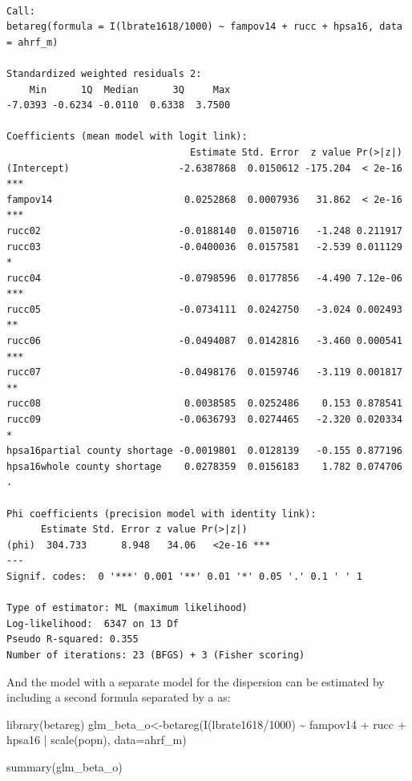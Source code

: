 \documentclass[
  letterpaper,
  DIV=11,
  numbers=noendperiod]{scrreprt}
\newenvironment{Shaded}{\begin{snugshade}}{\end{snugshade}}
\newcommand{\AttributeTok}[1]{\textcolor[rgb]{0.40,0.45,0.13}{#1}}
\newcommand{\DecValTok}[1]{\textcolor[rgb]{0.68,0.00,0.00}{#1}}
\newcommand{\FunctionTok}[1]{\textcolor[rgb]{0.28,0.35,0.67}{#1}}
\newcommand{\NormalTok}[1]{\textcolor[rgb]{0.00,0.23,0.31}{#1}}
\newcommand{\OtherTok}[1]{\textcolor[rgb]{0.00,0.23,0.31}{#1}}
\newcommand{\SpecialCharTok}[1]{\textcolor[rgb]{0.37,0.37,0.37}{#1}}
\begin{document}
\begin{verbatim}

Call:
betareg(formula = I(lbrate1618/1000) ~ fampov14 + rucc + hpsa16, data = ahrf_m)

Standardized weighted residuals 2:
    Min      1Q  Median      3Q     Max 
-7.0393 -0.6234 -0.0110  0.6338  3.7500 

Coefficients (mean model with logit link):
                                Estimate Std. Error  z value Pr(>|z|)    
(Intercept)                   -2.6387868  0.0150612 -175.204  < 2e-16 ***
fampov14                       0.0252868  0.0007936   31.862  < 2e-16 ***
rucc02                        -0.0188140  0.0150716   -1.248 0.211917    
rucc03                        -0.0400036  0.0157581   -2.539 0.011129 *  
rucc04                        -0.0798596  0.0177856   -4.490 7.12e-06 ***
rucc05                        -0.0734111  0.0242750   -3.024 0.002493 ** 
rucc06                        -0.0494087  0.0142816   -3.460 0.000541 ***
rucc07                        -0.0498176  0.0159746   -3.119 0.001817 ** 
rucc08                         0.0038585  0.0252486    0.153 0.878541    
rucc09                        -0.0636793  0.0274465   -2.320 0.020334 *  
hpsa16partial county shortage -0.0019801  0.0128139   -0.155 0.877196    
hpsa16whole county shortage    0.0278359  0.0156183    1.782 0.074706 .  

Phi coefficients (precision model with identity link):
      Estimate Std. Error z value Pr(>|z|)    
(phi)  304.733      8.948   34.06   <2e-16 ***
---
Signif. codes:  0 '***' 0.001 '**' 0.01 '*' 0.05 '.' 0.1 ' ' 1 

Type of estimator: ML (maximum likelihood)
Log-likelihood:  6347 on 13 Df
Pseudo R-squared: 0.355
Number of iterations: 23 (BFGS) + 3 (Fisher scoring) 
\end{verbatim}

And the model with a separate model for the dispersion can be estimated
by including a second formula separated by a \texttt{\textbar{}} as:

\begin{Shaded}
\begin{Highlighting}[]
\FunctionTok{library}\NormalTok{(betareg)}
\NormalTok{glm\_beta\_o}\OtherTok{\textless{}{-}}\FunctionTok{betareg}\NormalTok{(}\FunctionTok{I}\NormalTok{(lbrate1618}\SpecialCharTok{/}\DecValTok{1000}\NormalTok{) }\SpecialCharTok{\textasciitilde{}}\NormalTok{  fampov14 }\SpecialCharTok{+}\NormalTok{ rucc }\SpecialCharTok{+}\NormalTok{ hpsa16 }\SpecialCharTok{|} \FunctionTok{scale}\NormalTok{(popn), }
                  \AttributeTok{data=}\NormalTok{ahrf\_m)}

\FunctionTok{summary}\NormalTok{(glm\_beta\_o)}
\end{Highlighting}
\end{Shaded}
\end{document}
